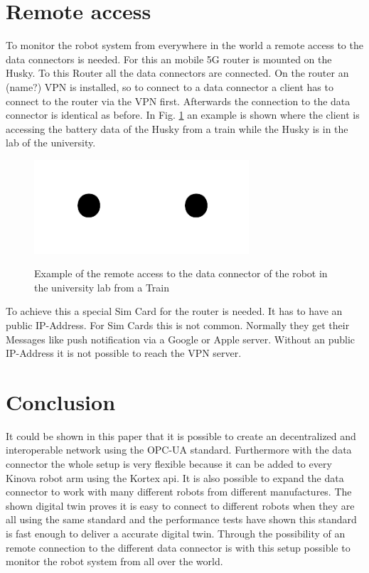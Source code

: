 \documentclass[conference]{IEEEtran}
\begin{document}
\section{Remote access}
To monitor the robot system from everywhere in the world a remote access to the data connectors is needed.
For this an mobile 5G router is mounted on the Husky. To this Router all the data connectors are connected.
On the router an (name?) VPN is installed, so to connect to a data connector a client has to connect to the router via the VPN first.
Afterwards the connection to the data connector is identical as before.
In Fig. \ref{fig:RemoteAccess} an example is shown where the client is accessing the battery data of the Husky from a train while the Husky is in the lab of the university.
\begin{figure}[htbp]
    \centerline{\includegraphics[width=4cm]{Pictures/fig1.png}\includegraphics[width=4cm]{Pictures/fig1.png}}
    \caption{Example of the remote access to the data connector of the robot in the university lab from a Train}
    \label{fig:RemoteAccess}
\end{figure}
To achieve this a special Sim Card for the router is needed.
It has to have an public IP-Address. For Sim Cards this is not common.
Normally they get their Messages like push notification via a Google or Apple server.
Without an public IP-Address it is not possible to reach the VPN server.
\section{Conclusion}
It could be shown in this paper that it is possible to create an decentralized and interoperable network using the OPC-UA standard.
Furthermore with the data connector the whole setup is very flexible because it can be added to every Kinova robot arm using the Kortex api.
It is also possible to expand the data connector to work with many different robots from different manufactures.
The shown digital twin proves it is easy to connect to different robots when they are all using the same standard and the performance tests have shown this standard is fast enough to deliver a accurate digital twin.
Through the possibility of an remote connection to the different data connector is with this setup possible to monitor the robot system from all over the world.
\end{document}
